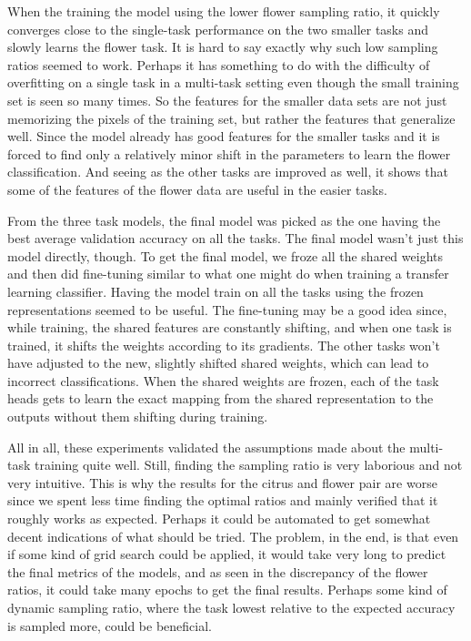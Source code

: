 When the training the model using the lower flower sampling ratio, it quickly converges close to the single-task performance on the two smaller tasks and slowly learns the flower task.
It is hard to say exactly why such low sampling ratios seemed to work.
Perhaps it has something to do with the difficulty of overfitting on a single task in a multi-task setting even though the small training set is seen so many times.
So the features for the smaller data sets are not just memorizing the pixels of the training set, but rather the features that generalize well.
Since the model already has good features for the smaller tasks and it is forced to find only a relatively minor shift in the parameters to learn the flower classification.
And seeing as the other tasks are improved as well, it shows that some of the features of the flower data are useful in the easier tasks.

From the three task models, the final model was picked as the one having the best average validation accuracy on all the tasks.
The final model wasn't just this model directly, though.
To get the final model, we froze all the shared weights and then did fine-tuning similar to what one might do when training a transfer learning classifier.
Having the model train on all the tasks using the frozen representations seemed to be useful.
The fine-tuning may be a good idea since, while training, the shared features are constantly shifting, and when one task is trained, it shifts the weights according to its gradients.
The other tasks won't have adjusted to the new, slightly shifted shared weights, which can lead to incorrect classifications.
When the shared weights are frozen, each of the task heads gets to learn the exact mapping from the shared representation to the outputs without them shifting during training.

All in all, these experiments validated the assumptions made about the multi-task training quite well.
Still, finding the sampling ratio is very laborious and not very intuitive.
This is why the results for the citrus and flower pair are worse since we spent less time finding the optimal ratios and mainly verified that it roughly works as expected.
Perhaps it could be automated to get somewhat decent indications of what should be tried.
The problem, in the end, is that even if some kind of grid search could be applied, it would take very long to predict the final metrics of the models, and as seen in the discrepancy of the flower ratios, it could take many epochs to get the final results.
Perhaps some kind of dynamic sampling ratio, where the task lowest relative to the expected accuracy is sampled more, could be beneficial.

